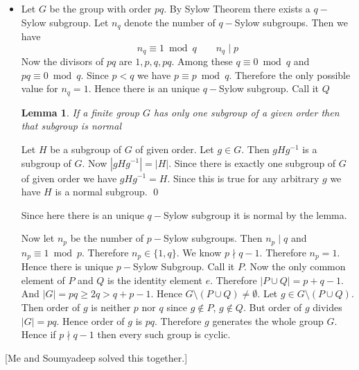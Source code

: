 \documentclass[a4paper, 11pt]{article}
\newtheorem{lemma}{Lemma}
\renewenvironment{proof}{\noindent{\it \textbf{Proof:}}\hspace*{1em}}{\hfill\qed\bigskip\\}
\begin{document}
{\begin{itemize}[label=$\bullet$]
	\item Let $G$ be the group with order $pq$. By Sylow Theorem there exists a $q-$Sylow subgroup. Let $n_q$ denote the number of $q-$Sylow subgroups. Then we have $$n_q\equiv 1\bmod q\qquad n_q\mid p$$
	Now the divisors of $pq$ are $1,p,q,pq$. Among these $q\equiv 0 \bmod q$ and $pq\equiv 0\bmod q$. Since $p<q $ we have $p\equiv p\bmod q$. Therefore the only possible value for $n_q=1$. Hence there is an unique $q-$Sylow subgroup. Call it $Q$
	\begin{lemma}
		If a finite group $G$ has only one subgroup of a given order then that subgroup is normal
	\end{lemma}
\begin{proof}
	Let $H$ be a subgroup of $G$ of given order. Let $g\in G$. Then $gHg^{-1}$ is a subgroup of $G$. Now $|gHg^{-1}|=|H|$. Since there is exactly one subgroup of $G$ of given order we have $gHg^{-1}=H$. Since this is true for any arbitrary $g$ we have $H$ is a normal subgroup.
\end{proof}

Since here there is an unique $q-$Sylow subgroup it is normal by the lemma.

Now let $n_p$ be the number of $p-$Sylow subgroups. Then $n_p\mid q$ and $n_p\equiv 1\bmod p$. Therefore $n_p\in \{1,q\}$. We know $p\nmid q-1$. Therefore $n_p=1$. Hence there is unique $p-$Sylow Subgroup. Call it $P$. Now the only common element of $P$ and $Q$ is the identity element $e$. Therefore $|P\cup Q|=p+q-1$. And $|G|=pq\geq 2q>q+p-1$. Hence $G\setminus (P\cup Q)\neq \emptyset$. Let $g\in G\setminus (P\cup Q)$. Then order of $g$ is neither $p$ nor $q$ since $g\notin P$, $g\notin Q$. But order of $g$ divides $|G|=pq$. Hence order of $g$ is $pq$. Therefore $g$ generates the whole group $G$. Hence if $p\nmid q-1$ then every such group is cyclic.
\end{itemize}	
}\parinf

[Me and Soumyadeep solved this together.]\parinn
\end{document}
